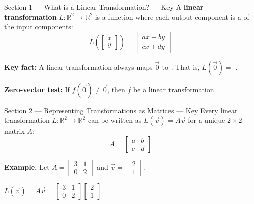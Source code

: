 \documentclass[10pt]{article}
\begin{document}
\begin{notesbox}{Section 1 --- What is a Linear Transformation? --- Key}
\small
A \textbf{linear transformation} $L:\mathbb{R}^2\to\mathbb{R}^2$ is a function where each
output component is a  of the input components:
\[
  L\!\left(\begin{bmatrix}x\\y\end{bmatrix}\right)
  = \begin{bmatrix}ax+by\\ cx+dy\end{bmatrix}
\]

\textbf{Key fact:} A linear transformation always maps $\vec{0}$ to
.
That is, $L(\vec{0}) = $ .

\vspace{0.08in}
\textbf{Zero-vector test:} If $f(\vec{0}) \ne \vec{0}$, then $f$ 
be a linear transformation.
\end{notesbox}

\vspace{0.08in}

\begin{notesbox}{Section 2 --- Representing Transformations as Matrices --- Key}
\small
Every linear transformation $L:\mathbb{R}^2\to\mathbb{R}^2$ can be written as
$L(\vec{v}) = A\vec{v}$ for a unique $2\times 2$ matrix $A$:
\[
  A = \begin{bmatrix}a & b\\ c & d\end{bmatrix}
\]

\textbf{Example.}  Let $A = \begin{bmatrix}3 & 1 \\ 0 & 2\end{bmatrix}$
and $\vec{v} = \begin{bmatrix}2\\1\end{bmatrix}$.

\vspace{0.06in}
$L(\vec{v}) = A\vec{v} =
\begin{bmatrix}3 & 1 \\ 0 & 2\end{bmatrix}
\begin{bmatrix}2\\1\end{bmatrix}
= $ 
\end{notesbox}
\end{document}
